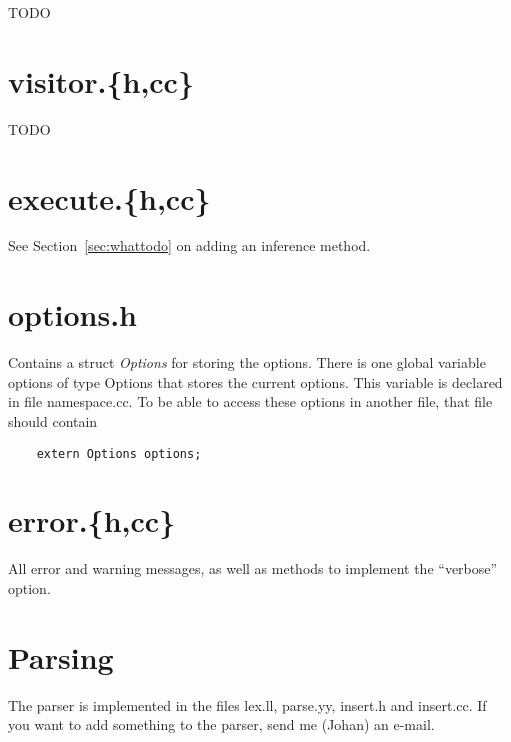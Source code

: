 \documentclass{article}
\begin{document}
TODO

\section{visitor.\{h,cc\}}

TODO

\section{execute.\{h,cc\}}

See Section~\ref{sec:whattodo} on adding an inference method.

\section{options.h}

Contains a struct \emph{Options} for storing the options. There is one global variable options of type Options that stores the current options. This variable is declared in file namespace.cc. To be able to access these options in another file, that file should contain 
\begin{lstlisting}
	extern Options options;
\end{lstlisting}

\section{error.\{h,cc\}}

All error and warning messages, as well as methods to implement the ``verbose'' option.

\section{Parsing}

The parser is implemented in the files lex.ll, parse.yy, insert.h and insert.cc. If you want to add something to the parser, send me (Johan) an e-mail.
\end{document}
